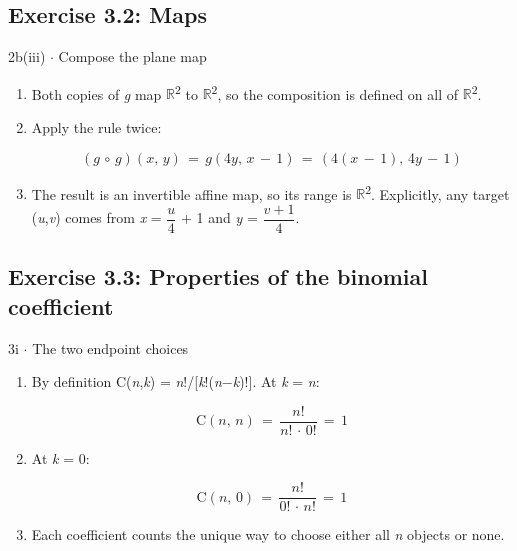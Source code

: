 \documentclass[11pt]{article}
\begin{document}
\begin{keepsection}\subsection{Exercise 3.2: Maps}

\begin{workedbox}{2b(iii) \ensuremath{\cdot} Compose the plane map}
\begin{enumerate}
\item Both copies of \textit{g} map \ensuremath{\mathbb{R}}\textsuperscript{2} to \ensuremath{\mathbb{R}}\textsuperscript{2}, so the composition is defined on all of \ensuremath{\mathbb{R}}\textsuperscript{2}.
\item {}
Apply the rule twice:

\begin{equation*}({g}\, \circ \, {g})({x},\, {y})\, =\, {g}(4{y},\, {x}\, -\, 1)\, =\, (4({x}\, -\, 1),\, 4{y}\, -\, 1)\end{equation*}
\item The result is an invertible affine map, so its range is \ensuremath{\mathbb{R}}\textsuperscript{2}. Explicitly, any target (\textit{u},\textit{v}) comes from \textit{x} = {\small\ensuremath{\dfrac{{u}}{4}}} + 1 and \textit{y} = {\small\ensuremath{\dfrac{{v}+1}{4}}}.
\end{enumerate}
\end{workedbox}

\end{keepsection}
\begin{keepsection}\subsection{Exercise 3.3: Properties of the binomial coefficient}

\begin{workedbox}{3i \ensuremath{\cdot} The two endpoint choices}
\begin{enumerate}
\item {}
By definition C(\textit{n},\textit{k}) = \textit{n}!/[\textit{k}!(\textit{n}\ensuremath{-}\textit{k})!]. At \textit{k} = \textit{n}:

\begin{equation*}\mathrm{C}({n},\, {n})\, =\, \dfrac{{n}!}{{n}!\, \cdot \, 0!}\, =\, 1\end{equation*}
\item {}
At \textit{k} = 0:

\begin{equation*}\mathrm{C}({n},\, 0)\, =\, \dfrac{{n}!}{0!\, \cdot \, {n}!}\, =\, 1\end{equation*}
\item Each coefficient counts the unique way to choose either all \textit{n} objects or none.
\end{enumerate}
\end{workedbox}

\end{keepsection}
\end{document}
